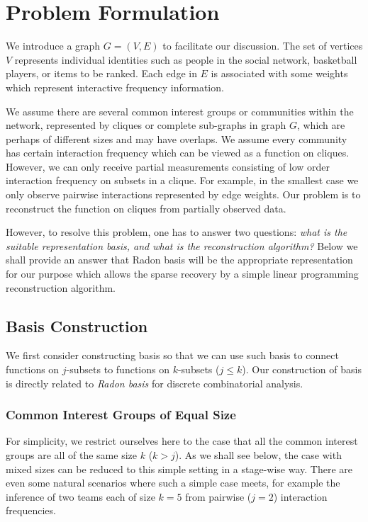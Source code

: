 \documentclass{article}
\begin{document}
\section{Problem Formulation}

We introduce a graph $G=(V,E)$ to facilitate our discussion. The set of vertices $V$ represents individual identities such as
people in the social network, basketball players, or items to be ranked. Each edge in $E$ is associated with some weights which represent interactive frequency information.

We assume there are several common interest groups or communities within the network, represented by cliques or complete sub-graphs in graph $G$, which are perhaps of different sizes and may have overlaps. We assume every community has certain interaction frequency which can be 
viewed as a function on cliques. However, we can only receive partial measurements consisting of 
low order interaction frequency on subsets in a clique. For example, in the smallest case we only
observe pairwise interactions represented by edge weights. Our problem is to reconstruct the function on cliques from partially observed data. 

However, to resolve this problem, one has to answer two questions: {\it what is the suitable representation 
basis, and what is the reconstruction algorithm?} Below we shall provide an answer that Radon basis will be the appropriate representation for our purpose which allows the sparse recovery by a simple linear programming reconstruction algorithm. 


\subsection{Basis Construction}
We first consider constructing basis so that we can use such basis to connect functions on $j$-subsets to
functions on $k$-subsets ($j\leq k$). Our construction 
of basis is directly related to {\it Radon basis} for discrete combinatorial analysis.  


\subsubsection{Common Interest Groups of Equal Size}
For simplicity, we restrict ourselves here to the case that all the common interest groups are all of the same size $k$ ($k>j$). As we shall see below, the case with mixed sizes can be reduced to this simple setting in a stage-wise way. There are even some natural scenarios where such a simple case meets, for example the inference of two teams each of size $k=5$ from pairwise ($j=2$) interaction frequencies. 
\end{document}
